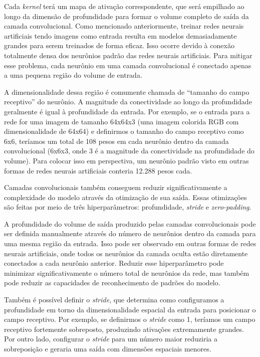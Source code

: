 Cada \textit{kernel} terá um mapa de ativação correspondente, que será empilhado ao longo da dimensão de profundidade para formar o volume completo de saída da camada convolucional. Como mencionado anteriormente, treinar redes neurais artificiais tendo imagens como entrada resulta em modelos demasiadamente grandes para serem treinados de forma eficaz. Isso ocorre devido à conexão totalmente densa dos neurônios padrão das redes neurais artificiais. Para mitigar esse problema, cada neurônio em uma camada convolucional é conectado apenas a uma pequena região do volume de entrada. 

A dimensionalidade dessa região é comumente chamada de ``tamanho do campo receptivo'' do neurônio. A magnitude da conectividade ao longo da profundidade geralmente é igual à profundidade da entrada. Por exemplo, se o entrada para a rede for uma imagem de tamanho 64x64x3 (uma imagem colorida RGB com dimensionalidade de 64x64) e definirmos o tamanho do campo receptivo como 6x6, teríamos um total de 108 pesos em cada neurônio dentro da camada convolucional (6x6x3, onde 3 é a magnitude da conectividade na profundidade do volume). Para colocar isso em perspectiva, um neurônio padrão visto em outras formas de redes neurais artificiais conteria 12.288 pesos cada. 

Camadas convolucionais também conseguem reduzir significativamente a complexidade do modelo através da otimização de sua saída. Essas otimizações são feitas por meio de três hiperparâmetros: profundidade, \textit{stride} e \textit{zero-padding}. 

A profundidade do volume de saída produzido pelas camadas convolucionais pode ser definida manualmente através do número de neurônios dentro da camada para uma mesma região da entrada. Isso pode ser observado em outras formas de redes neurais artificiais, onde todos os neurônios da camada oculta estão diretamente conectados a cada neurônio anterior. Reduzir esse hiperparâmetro pode minimizar significativamente o número total de neurônios da rede, mas também pode reduzir as capacidades de reconhecimento de padrões do modelo. 

Também é possível definir o \textit{stride}, que determina como configuramos a profundidade em torno da dimensionalidade espacial da entrada para posicionar o campo receptivo. Por exemplo, se definirmos o \textit{stride} como 1, teríamos um campo receptivo fortemente sobreposto, produzindo ativações extremamente grandes. Por outro lado, configurar o \textit{stride} para um número maior reduziria a sobreposição e geraria uma saída com dimensões espaciais menores.  

